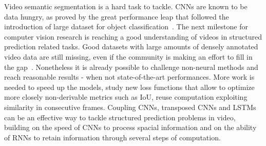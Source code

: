 Video semantic segmentation is a hard task to tackle. CNNs are known to be
data hungry, as proved by the great performance leap that followed the
introduction of large dataset for object classification~\citep{ILSVRCarxiv14}.
The next milestone for computer vision research is reaching a good
understanding of videos in structured prediction related tasks. Good datasets
with large amounts of densely annotated video data are still missing, even if
the community is making an effort to fill in the gap~\citep[see~e.g.,~][]{
Perazzi2016}. Nonetheless it is already possible to challenge non-neural
methods and reach reasonable results - when not state-of-the-art performances.
More work is needed to speed up the models, study new loss functions that allow
to optimize more closely non-derivable metrics such as IoU, reuse computation
exploiting similarity in consecutive frames. Coupling CNNs, transposed CNNs
and LSTMs can be an effective way to tackle structured prediction problems in
video, building on the speed of CNNs to process spacial information and on the
ability of RNNs to retain information through several steps of computation.



